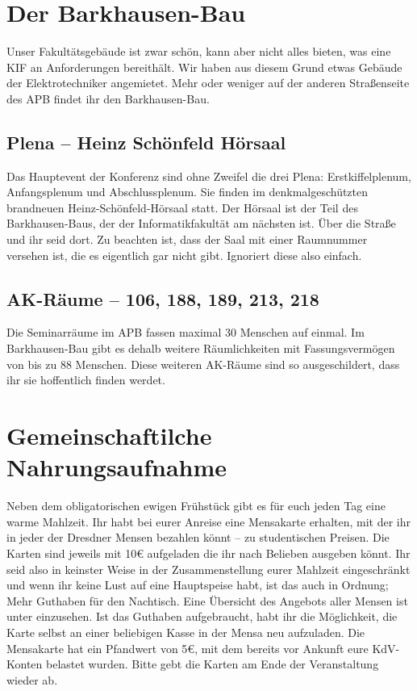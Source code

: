 \pagebreak

\section*{Der Barkhausen-Bau}
Unser Fakultätsgebäude ist zwar schön, kann aber nicht alles bieten, was eine KIF an Anforderungen bereithält.
Wir haben aus diesem Grund etwas Gebäude der Elektrotechniker angemietet.
Mehr oder weniger auf der anderen Straßenseite des APB findet ihr den Barkhausen-Bau.

\subsection*{Plena -- Heinz Schönfeld Hörsaal}
Das Hauptevent der Konferenz sind ohne Zweifel die drei Plena: Erstkiffelplenum, Anfangsplenum und Abschlussplenum.
Sie finden im denkmalgeschützten brandneuen Heinz-Schönfeld-Hörsaal statt.
Der Hörsaal ist der Teil des Barkhausen-Baus, der der Informatikfakultät am nächsten ist.
Über die Straße und ihr seid dort.
Zu beachten ist, dass der Saal mit einer Raumnummer versehen ist, die es eigentlich gar nicht gibt.
Ignoriert diese also einfach.

\subsection*{AK-Räume -- 106, 188, 189, 213, 218}
Die Seminarräume im APB fassen maximal 30 Menschen auf einmal.
Im Barkhausen-Bau gibt es dehalb weitere Räumlichkeiten mit Fassungsvermögen von bis zu 88 Menschen.
Diese weiteren AK-Räume sind so ausgeschildert, dass ihr sie hoffentlich finden werdet.

\section*{Gemeinschaftilche Nahrungsaufnahme}
Neben dem obligatorischen ewigen Frühstück gibt es für euch jeden Tag eine warme Mahlzeit.
Ihr habt bei eurer Anreise eine Mensakarte erhalten, mit der ihr in jeder der Dresdner Mensen bezahlen könnt -- zu studentischen Preisen.
Die Karten sind jeweils mit 10€ aufgeladen die ihr nach Belieben ausgeben könnt.
Ihr seid also in keinster Weise in der Zusammenstellung eurer Mahlzeit eingeschränkt und wenn ihr keine Lust auf eine Hauptspeise habt, ist das auch in Ordnung; Mehr Guthaben für den Nachtisch.
Eine Übersicht des Angebots aller Mensen ist unter  einzusehen.
Ist das Guthaben aufgebraucht, habt ihr die Möglichkeit, die Karte selbst an einer beliebigen Kasse in der Mensa neu aufzuladen.
Die Mensakarte hat ein Pfandwert von 5€, mit dem bereits vor Ankunft eure KdV-Konten belastet wurden.
Bitte gebt die Karten am Ende der Veranstaltung wieder ab.

